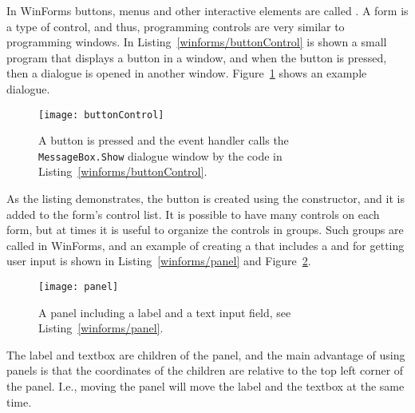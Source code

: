 In WinForms buttons, menus and other interactive elements are called . A form is a type of control, and thus, programming controls are very similar to programming windows. In Listing~\ref{winforms/buttonControl} is shown a small program that displays a button in a window, and when the button is pressed, then a dialogue is opened in another window. Figure~\ref{fig:buttonControl} shows an example dialogue.
%
%
\begin{figure}
  \centering
  \texttt{[image: buttonControl]}
  \caption{A button is pressed and the event handler calls the \lstinline!MessageBox.Show! dialogue window by the code in Listing~\ref{winforms/buttonControl}.}
  \label{fig:buttonControl}
\end{figure}
%
As the listing demonstrates, the button is created using the  constructor, and it is added to the form's control list. It is possible to have many controls on each form, but at times it is useful to organize the controls in groups. Such groups are called  in WinForms, and an example of creating a  that includes a  and  for getting user input is shown in Listing~\ref{winforms/panel} and Figure~\ref{fig:panel}. 
%
%
\begin{figure}
  \centering
  \texttt{[image: panel]}
  \caption{A panel including a label and a text input field, see Listing~\ref{winforms/panel}.}
  \label{fig:panel}
\end{figure}
The label and textbox are children of the panel, and the main advantage of using panels is that the coordinates of the children are relative to the top left corner of the panel. I.e., moving the panel will move the label and the textbox at the same time.

